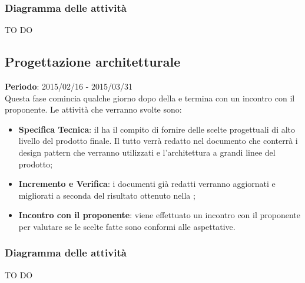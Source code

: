 		\subsubsection{Diagramma delle attività} %
		\label{ssub:diagramma_delle_attivita}
		TO DO
	
	\subsection{Progettazione architetturale} %
	\label{sub:progettazione_architetturale}
	\textbf{Periodo}:  2015/02/16 - 2015/03/31 \\
	Questa fase comincia qualche giorno dopo della \RR{} e termina con un incontro con il proponente.
	Le attività che verranno svolte sono:
		\begin{itemize}
			\item \textbf{Specifica Tecnica}: il \roleDesigner{} ha il compito di fornire delle scelte progettuali di alto livello del prodotto finale. Il tutto verrà redatto nel documento \docNameVersionST{} che conterrà i design pattern che verranno utilizzati e l'architettura a grandi linee del prodotto;
			\item \textbf{Incremento e Verifica}: i documenti già redatti verranno aggiornati e migliorati a seconda del risultato ottenuto nella \RR;
			\item \textbf{Incontro con il proponente}: viene effettuato un incontro con il proponente per valutare se le scelte fatte sono conformi alle aspettative.
		\end{itemize}
		
		\subsubsection{Diagramma delle attività} %
		\label{ssub:diagramma_delle_attivita}
		TO DO
	
